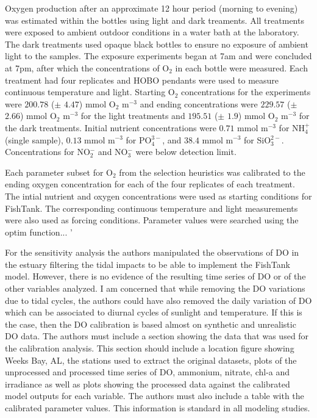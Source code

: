 \documentclass[letterpaper,12pt]{article}\usepackage[]{graphicx}\usepackage[]{color}
\begin{document}
{Oxygen production after an approximate 12 hour period (morning to evening) was estimated within the bottles using light and dark treaments.  All treatments were exposed to ambient outdoor conditions in a water bath at the laboratory.  The dark treatments used opaque black bottles to ensure no exposure of ambient light to the samples.  The exposure experiments began at 7am and were concluded at 7pm, after which the concentrations of O$_2$ in each bottle were measured.  Each treatment had four replicates and HOBO\textsuperscript{\textregistered} pendants were used to measure continuous temperature and light. Starting O$_2$ concentrations for the experiments were $200.78$ ($\pm$ $4.47$) mmol O$_2$ m$^{-3}$ and ending concentrations were $229.57$ ($\pm$ $2.66$) mmol O$_2$ m$^{-3}$ for the light treatments and $195.51$ ($\pm$ $1.9$) mmol O$_2$ m$^{-3}$ for the dark treatments.  Initial nutrient concentrations were $0.71$ mmol m$^{-3}$ for NH$_4^+$ (single sample), $0.13$ mmol m$^{-3}$ for PO$_4^{3-}$, and $38.4$ mmol m$^{-3}$ for SiO$_3^{2-}$. Concentrations for NO$_2^-$ and NO$_3^-$ were below detection limit.

Each parameter subset for O$_2$ from the selection heuristics was calibrated to the ending oxygen concentration for each of the four replicates of each treatment. The intial nutrient and oxygen concentrations were used as starting conditions for FishTank.  The corresponding continuous temperature and light measurements were also used as forcing conditions.  Parameter values were searched using the optim function...
'
}

For the sensitivity analysis the authors manipulated the observations of DO in the estuary filtering the tidal impacts to be able to implement the FishTank model. However, there is no evidence of the resulting time series of DO or of the other variables analyzed. I am concerned that while removing the DO variations due to tidal cycles, the authors could have also removed the daily variation of DO which can be associated to diurnal cycles of sunlight and temperature. If this is the case, then the DO calibration is based almost on synthetic and unrealistic DO data. The authors must include a section showing the data that was used for the calibration analysis. This section should include a location figure showing Weeks Bay, AL, the stations used to extract the original datasets, plots of the unprocessed and processed time series of DO, ammonium, nitrate, chl-a and irradiance as well as plots showing the processed data against the calibrated model outputs for each variable. The authors must also include a table with the calibrated parameter values. This information is standard in all modeling studies.
\end{document}

